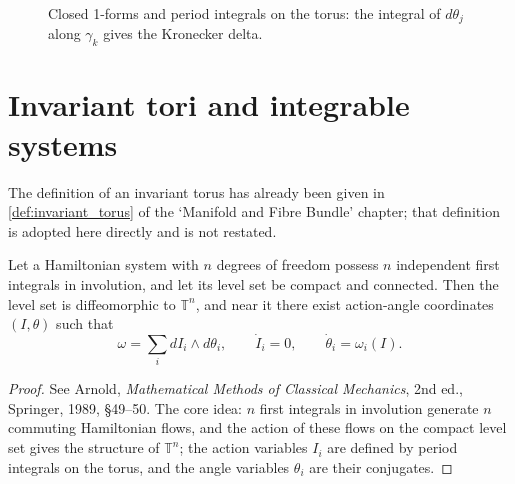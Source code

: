 \begin{figure}[htbp]
\centering
{}
\caption{Closed 1-forms and period integrals on the torus: the integral of $d\theta_j$ along $\gamma_k$ gives the Kronecker delta.}
\label{fig:period_integral}
\end{figure}

\section{Invariant tori and integrable systems}\label{sec:invariant_torus_periodic}

\begin{remark}\label{rem:invariant_torus_source}
The definition of an invariant torus has already been given in \cref{def:invariant_torus} of the `Manifold and Fibre Bundle' chapter; that definition is adopted here directly and is not restated.
\end{remark}

\begin{theorem}\label{thm:liouville_arnold_periodic}
Let a Hamiltonian system with $n$ degrees of freedom possess $n$ independent first integrals in involution, and let its level set be compact and connected. Then the level set is diffeomorphic to $\mathbb{T}^n$, and near it there exist action-angle coordinates $(I,\theta)$ such that
\[
\omega=\sum_i dI_i\wedge d\theta_i,\qquad \dot I_i=0,\qquad \dot\theta_i=\omega_i(I).
\]
\end{theorem}

\begin{proof}
See Arnold, \textit{Mathematical Methods of Classical Mechanics}, 2nd ed., Springer, 1989, \S{}49--50. The core idea: $n$ first integrals in involution generate $n$ commuting Hamiltonian flows, and the action of these flows on the compact level set gives the structure of $\mathbb{T}^n$; the action variables $I_i$ are defined by period integrals on the torus, and the angle variables $\theta_i$ are their conjugates.
\end{proof}

